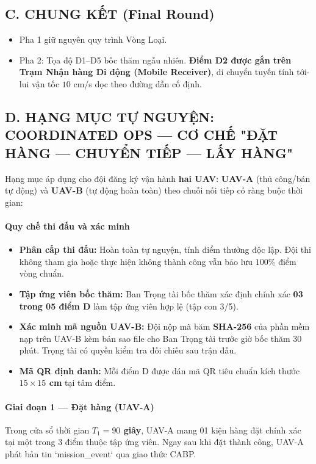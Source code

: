 \documentclass[12pt,a4paper]{article}
\begin{document}
\subsection*{C. CHUNG KẾT (Final Round)}
\begin{itemize}
\item Pha 1 giữ nguyên quy trình Vòng Loại.
\item Pha 2: Tọa độ D1–D5 bốc thăm ngẫu nhiên. \textbf{Điểm D2 được gắn trên Trạm Nhận hàng Di động (Mobile Receiver)}, di chuyển tuyến tính tới-lui vận tốc $10$ cm/s dọc theo đường dẫn cố định.
\end{itemize}

\subsection*{D. HẠNG MỤC TỰ NGUYỆN: COORDINATED OPS — CƠ CHẾ "ĐẶT HÀNG — CHUYỂN TIẾP — LẤY HÀNG"}

Hạng mục áp dụng cho đội đăng ký vận hành \textbf{hai UAV}: \textbf{UAV-A} (thủ công/bán tự động) và \textbf{UAV-B} (tự động hoàn toàn) theo chuỗi nối tiếp có ràng buộc thời gian:

\paragraph{Quy chế thi đấu và xác minh}
\begin{itemize}
\item \textbf{Phân cấp thi đấu:} Hoàn toàn tự nguyện, tính điểm thưởng độc lập. Đội thi không tham gia hoặc thực hiện không thành công vẫn bảo lưu $100\%$ điểm vòng chuẩn.
\item \textbf{Tập ứng viên bốc thăm:} Ban Trọng tài bốc thăm xác định chính xác \textbf{03 trong 05 điểm D} làm tập ứng viên hợp lệ (tập con 3/5).
\item \textbf{Xác minh mã nguồn UAV-B:} Đội nộp mã băm \textbf{SHA-256} của phần mềm nạp trên UAV-B kèm bản sao file cho Ban Trọng tài trước giờ bốc thăm 30 phút. Trọng tài có quyền kiểm tra đối chiếu sau trận đấu.
\item \textbf{Mã QR định danh:} Mỗi điểm D được dán mã QR tiêu chuẩn kích thước \textbf{$15 \times 15$ cm} tại tâm điểm.
\end{itemize}

\paragraph{Giai đoạn 1 — Đặt hàng (UAV-A)}
Trong cửa sổ thời gian \textbf{$T_1 = 90$ giây}, UAV-A mang 01 kiện hàng đặt chính xác tại một trong 3 điểm thuộc tập ứng viên. Ngay sau khi đặt thành công, UAV-A phát bản tin `mission\_event` qua giao thức CABP.
\end{document}
